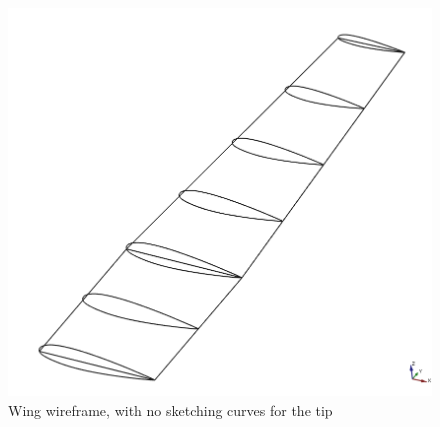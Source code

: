 \begin{figure}[H]
\centering
\includegraphics[scale=0.42]{Immagini/Capitolo3/WingWireframe}
\caption{Wing wireframe, with no sketching curves for the tip}
\label{fig:WingWireframe}
\end{figure}
% 

